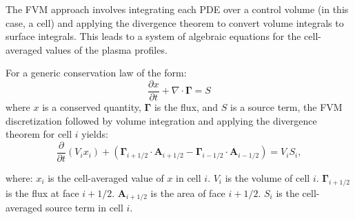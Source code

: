 \documentclass[aps, reprint, nofootinbib]{revtex4-2}
\begin{document}
The FVM approach involves integrating each PDE over a control volume (in this case, a cell) and applying the divergence theorem to convert volume integrals to surface integrals. This leads to a system of algebraic equations for the cell-averaged values of the plasma profiles. 

For a generic conservation law of the form:
\begin{equation}
\frac{\partial x}{\partial t} + \nabla \cdot \mathbf{\Gamma} = S
\end{equation}
%
where $x$ is a conserved quantity, $\mathbf{\Gamma}$ is the flux, and $S$ is a source term, the FVM discretization followed by volume integration and applying the divergence theorem for cell $i$ yields:
\begin{equation}
\label{eq:fvm}
\frac{\partial }{\partial t}(V_i x_i) + (\mathbf{\Gamma}_{i+1/2} \cdot \mathbf{A}_{i+1/2} - \mathbf{\Gamma}_{i-1/2} \cdot \mathbf{A}_{i-1/2})  = V_i S_i, \end{equation}

where:
$x_i$ is the cell-averaged value of $x$ in cell $i$.
$V_i$ is the volume of cell $i$.
$\mathbf{\Gamma}_{i+1/2}$ is the flux at face $i+1/2$.
$\mathbf{A}_{i+1/2}$ is the area of face $i+1/2$. $S_i$ is the cell-averaged source term in cell $i$.
\end{document}
